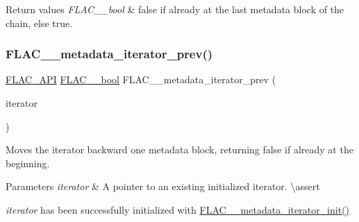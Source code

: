 \begin{DoxyRetVals}{Return values}
{\em F\+L\+A\+C\+\_\+\+\_\+bool} & {\ttfamily false} if already at the last metadata block of the chain, else {\ttfamily true}. \\
\hline
\end{DoxyRetVals}
\mbox{\label{group__flac__metadata__level2_ga003373a88bea6cea2df32f110a95e912}} 
\subsubsection{\texorpdfstring{FLAC\_\_metadata\_iterator\_prev()}{FLAC\_\_metadata\_iterator\_prev()}}
{\footnotesize\ttfamily \mbox{\hyperlink{group__flac__export_ga56ca07df8a23310707732b1c0007d6f5}{F\+L\+A\+C\+\_\+\+A\+PI}} \mbox{\hyperlink{ordinals_8h_a95103469f1cbd78b8cf250194985b34e}{F\+L\+A\+C\+\_\+\+\_\+bool}} F\+L\+A\+C\+\_\+\+\_\+metadata\+\_\+iterator\+\_\+prev (\begin{DoxyParamCaption}\item[{\mbox{\hyperlink{group__flac__metadata__level2_ga9f3e135a07cdef7e51597646aa7b89b2}{F\+L\+A\+C\+\_\+\+\_\+\+Metadata\+\_\+\+Iterator}} $\ast$}]{iterator }\end{DoxyParamCaption})}

Moves the iterator backward one metadata block, returning {\ttfamily false} if already at the beginning.


\begin{DoxyParams}{Parameters}
{\em iterator} & A pointer to an existing initialized iterator. \textbackslash{}assert 
\begin{DoxyCode}{1}
\end{DoxyCode}
 {\itshape iterator} has been successfully initialized with \mbox{\hyperlink{group__flac__metadata__level2_ga4a5af69a1f19436b02f738eb8c97c959}{F\+L\+A\+C\+\_\+\+\_\+metadata\+\_\+iterator\+\_\+init()}} \\
\hline
\end{DoxyParams}

